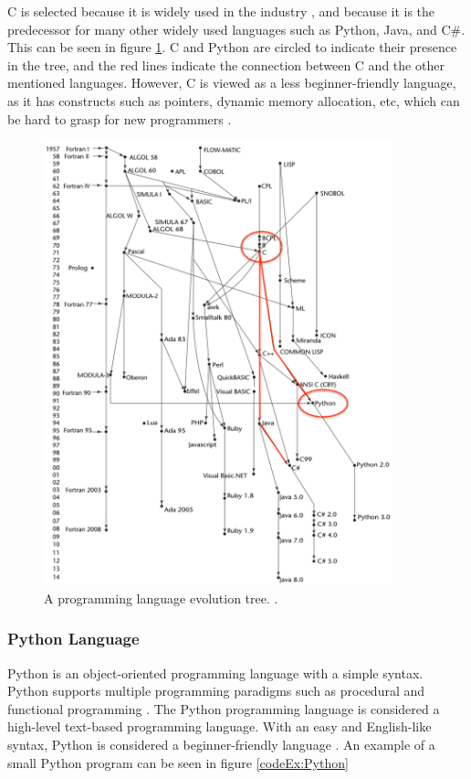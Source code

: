 C is selected because it is widely used in the industry \cite{5ReasonsForC}, and because it is the predecessor for many other widely used languages such as Python, Java, and C\#. This can be seen in figure \ref{Prog_Lang_Tree}. C and Python are circled to indicate their presence in the tree, and the red lines indicate the connection between C and the other mentioned languages. However, C is viewed as a less beginner-friendly language, as it has constructs such as pointers, dynamic memory allocation, etc, which can be hard to grasp for new programmers \cite{5ReasonsForC}. 

\begin{figure}[H] 
    \begin{center}
        \includegraphics[width=0.9\textwidth]{Files/Billeder: Analyse/ProgTree.png}
    \end{center}
    \caption{A programming language evolution tree. \cite{conceptsofproglang}.}
    \label{Prog_Lang_Tree}
\end{figure}

\newpage
\subsubsection{Python Language}
Python is an object-oriented programming language with a simple syntax. Python supports multiple programming paradigms such as procedural and functional programming \cite{PythonLanguageReference}. The Python programming language is considered a high-level text-based programming language. With an easy and English-like syntax, Python is considered a beginner-friendly language \cite{PythonGoodForBegin}. An example of a small Python program can be seen in figure \ref{codeEx:Python}\\

